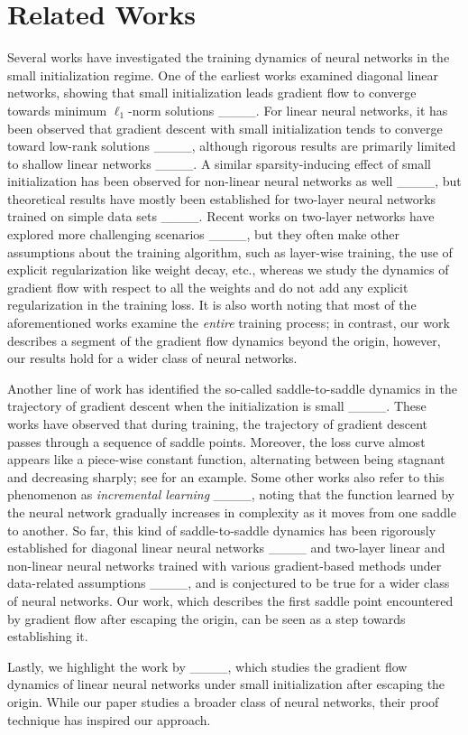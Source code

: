 \section{Related Works}
\label{sec_related_works}
Several works have investigated the training dynamics of neural networks in the small initialization regime. One of the earliest works examined diagonal linear networks, showing that small initialization leads gradient flow to converge towards minimum $\ell_1$-norm solutions ____. For linear neural networks, it has been observed that gradient descent with small initialization tends to converge toward low-rank solutions ____, although rigorous results are primarily limited to shallow linear networks ____. A similar sparsity-inducing effect of small initialization has been observed for non-linear neural networks as well ____, but theoretical results have mostly been established for two-layer neural networks trained on simple data sets ____. Recent works on two-layer networks have explored more challenging scenarios ____, but they often make other assumptions about the training algorithm, such as layer-wise training, the use of explicit regularization like weight decay, etc., whereas we study the dynamics of gradient flow with respect to all the weights and do not add any explicit regularization in the training loss. It is also worth noting that most of the aforementioned works examine the \emph{entire} training process; in contrast, our work describes a segment of the gradient flow dynamics beyond the origin, however, our results hold for a wider class of neural networks. 

Another line of work has identified the so-called saddle-to-saddle dynamics in the trajectory of gradient descent when the initialization is small ____.  These works have observed that during training, the trajectory of gradient descent passes through a sequence of saddle points. Moreover, the loss curve almost appears like a piece-wise constant function, alternating between being stagnant and decreasing sharply; see  for an example. Some other works also refer to this phenomenon as \emph{incremental learning} ____, noting that the function learned by the neural network gradually increases in complexity as it moves from one saddle to another. So far, this kind of saddle-to-saddle dynamics has been rigorously established for diagonal linear neural networks ____ and two-layer linear and non-linear neural networks trained with various gradient-based methods under data-related assumptions ____, and is conjectured to be true for a wider class of neural networks. Our work, which describes the first saddle point encountered by gradient flow after escaping the origin, can be seen as a step towards establishing it.

Lastly, we highlight the work by ____, which studies the gradient flow dynamics of linear neural networks under small initialization after escaping the origin. While our paper studies a broader class of neural networks, their proof technique has inspired our approach.